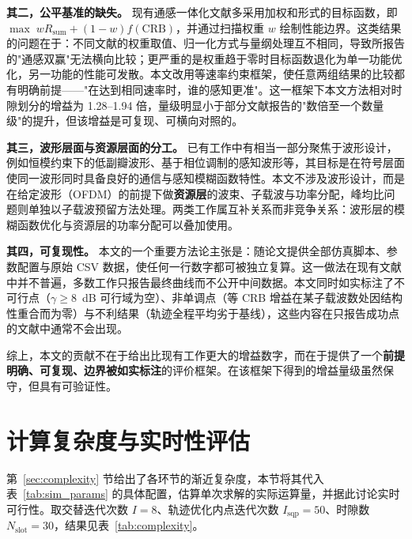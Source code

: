\textbf{其二，公平基准的缺失。} 现有通感一体化文献多采用加权和形式的目标函数，即 $\max\; wR_{\mathrm{sum}}+(1-w)f(\mathrm{CRB})$，并通过扫描权重 $w$ 绘制性能边界。这类结果的问题在于：不同文献的权重取值、归一化方式与量纲处理互不相同，导致所报告的"通感双赢"无法横向比较；更严重的是权重趋于零时目标函数退化为单一功能优化，另一功能的性能可发散。本文改用等速率约束框架，使任意两组结果的比较都有明确前提——"在达到相同速率时，谁的感知更准"。这一框架下本文方法相对时隙划分的增益为 1.28--1.94 倍，量级明显小于部分文献报告的"数倍至一个数量级"的提升，但该增益是可复现、可横向对照的。

\textbf{其三，波形层面与资源层面的分工。} 已有工作中有相当一部分聚焦于波形设计，例如恒模约束下的低副瓣波形、基于相位调制的感知波形等，其目标是在符号层面使同一波形同时具备良好的通信与感知模糊函数特性。本文不涉及波形设计，而是在给定波形（OFDM）的前提下做\textbf{资源层}的波束、子载波与功率分配，峰均比问题则单独以子载波预留方法处理。两类工作属互补关系而非竞争关系：波形层的模糊函数优化与资源层的功率分配可以叠加使用。

\textbf{其四，可复现性。} 本文的一个重要方法论主张是：随论文提供全部仿真脚本、参数配置与原始 CSV 数据，使任何一行数字都可被独立复算。这一做法在现有文献中并不普遍，多数工作只报告最终曲线而不公开中间数据。本文同时如实标注了不可行点（$\gamma\ge8$~dB 可行域为空）、非单调点（等 CRB 增益在某子载波数处因结构性重合而为零）与不利结果（轨迹全程平均劣于基线），这些内容在只报告成功点的文献中通常不会出现。

综上，本文的贡献不在于给出比现有工作更大的增益数字，而在于提供了一个\textbf{前提明确、可复现、边界被如实标注}的评价框架。在该框架下得到的增益量级虽然保守，但具有可验证性。

\section{计算复杂度与实时性评估}
\label{sec:exp_complexity}

第~\ref{sec:complexity} 节给出了各环节的渐近复杂度，本节将其代入表~\ref{tab:sim_params} 的具体配置，估算单次求解的实际运算量，并据此讨论实时可行性。取交替迭代次数 $I=8$、轨迹优化内点迭代次数 $I_{\mathrm{sqp}}=50$、时隙数 $N_{\mathrm{slot}}=30$，结果见表~\ref{tab:complexity}。

